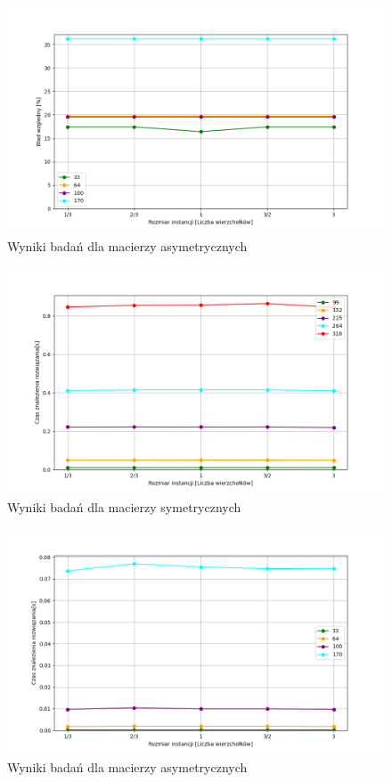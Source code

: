 \documentclass{article}
\begin{document}
        \begin{figure}[ht]
          \centering
          \includegraphics[width=\textwidth]{src/plots/asymAoAB.png}
          \caption{Wyniki badań dla macierzy asymetrycznych}
          \label{fig:asymAB}
        \end{figure}
        \FloatBarrier
        
        \FloatBarrier
        \begin{figure}[ht]
          \centering
          \includegraphics[width=\textwidth]{src/plots/symAoABTime.png}
          \caption{Wyniki badań dla macierzy symetrycznych}
          \label{fig:symABT}
        \end{figure}
        \begin{figure}[ht]
          \centering
          \includegraphics[width=\textwidth]{src/plots/asymAoABTime.png}
          \caption{Wyniki badań dla macierzy asymetrycznych}
          \label{fig:asymABT}
        \end{figure}
\end{document}
